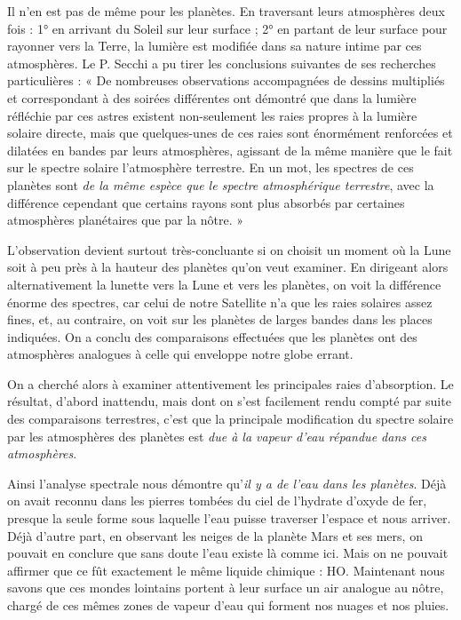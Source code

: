 \documentclass[a4paper, 11pt, oneside, landscape]{article}
\begin{document}
Il n'en est pas de même pour les planètes. En traversant leurs atmosphères deux fois : 1° en arrivant du Soleil sur leur surface ; 2° en partant de leur surface pour rayonner vers la Terre, la lumière est modifiée dans sa nature intime par ces atmosphères. Le P. Secchi a pu tirer les conclusions suivantes de ses recherches particulières : « De nombreuses observations accompagnées de dessins multipliés et correspondant à des soirées différentes ont démontré que dans la lumière réfléchie par ces astres existent non-seulement les raies propres à la lumière solaire directe, mais que quelques-unes de ces raies sont énormément renforcées et dilatées en bandes par leurs atmosphères, agissant de la même manière que le fait sur le spectre solaire l'atmosphère terrestre. En un mot, les spectres de ces planètes sont \emph{de la même espèce que le spectre atmosphérique terrestre}, avec la différence cependant que certains rayons sont plus absorbés par certaines atmosphères planétaires que par la nôtre. »

L'observation devient surtout très-concluante si on choisit un moment où la Lune soit à peu près à la hauteur des planètes qu'on veut examiner. En dirigeant alors alternativement la lunette vers la Lune et vers les planètes, on voit la différence énorme des spectres, car celui de notre Satellite n'a que les raies solaires assez fines, et, au contraire, on voit sur les planètes de larges bandes dans les places indiquées. On a conclu des comparaisons effectuées que les planètes ont des atmosphères analogues à celle qui enveloppe notre globe errant.

On a cherché alors à examiner attentivement les principales raies d'absorption. Le résultat, d'abord inattendu, mais dont on s'est facilement rendu compté par suite des comparaisons terrestres, c'est que la principale modification du spectre solaire par les atmosphères des planètes est \emph{due à la vapeur d'eau répandue dans ces atmosphères}.

Ainsi l'analyse spectrale nous démontre qu'\emph{il y a de l'eau dans les planètes}. Déjà on avait reconnu dans les pierres tombées du ciel de l'hydrate d'oxyde de fer, presque la seule forme sous laquelle l'eau puisse traverser l'espace et nous arriver. Déjà d'autre part, en observant les neiges de la planète Mars et ses mers, on pouvait en conclure que sans doute l'eau existe là comme ici. Mais on ne pouvait affirmer que ce fût exactement le même liquide chimique : HO. Maintenant nous savons que ces mondes lointains portent à leur surface un air analogue au nôtre, chargé de ces mêmes zones de vapeur d'eau qui forment nos nuages et nos pluies.
\end{document}
